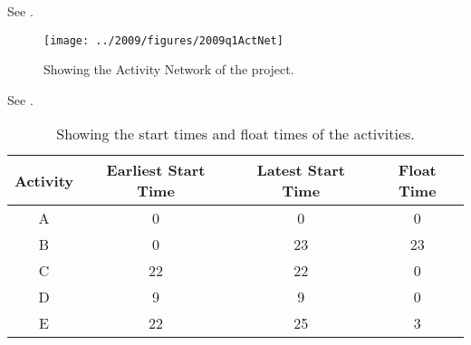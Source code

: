 %
%

\begin{subquestions}


\subquestion

See .

\begin{figure}
	\begin{center}
		\texttt{[image: ../2009/figures/2009q1ActNet]}
		\caption{\label{2001:q1:fig:ActNet} Showing the Activity Network of the project.}
	\end{center}
\end{figure}


\subquestion

See .

\begin{table}[ht]
	\centering
	\begin{tabular}{|c|c|c|c|}
		\hline
		Activity & Earliest Start Time & Latest Start Time & Float Time \\
		\hline
		A & 0 & 0 & 0 \\
		B & 0 & 23 & 23 \\ 
		C & 22 & 22 & 0 \\
		D & 9 & 9 & 0 \\
		E & 22 & 25 & 3 \\
		\hline
	\end{tabular}
	\caption{\label{2009:q1:tab:CritPath} Showing the start times and float times of the activities.}
\end{table}


\end{subquestions}
